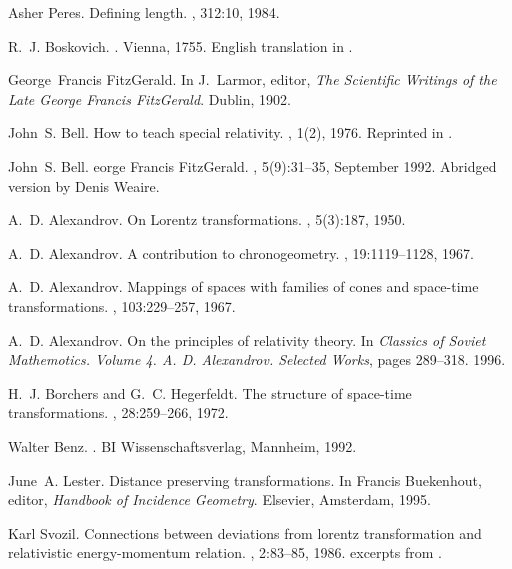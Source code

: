 \begin{thebibliography}{10}
Asher Peres.
\newblock Defining length.
, 312:10, 1984.

R.~J. Boskovich.
.
\newblock Vienna, 1755.
\newblock English translation in \cite{bos1}.

George~Francis FitzGerald.
\newblock In J.~Larmor, editor, {\em The Scientific Writings of the Late
  {G}eorge {F}rancis {F}itzGerald}. Dublin, 1902.

John~S. Bell.
\newblock How to teach special relativity.
, 1(2), 1976.
\newblock Reprinted in \cite[pp. 67-80]{bell-87}.

John~S. Bell.
eorge {F}rancis {F}itz{G}erald.
, 5(9):31--35, September 1992.
\newblock Abridged version by Denis Weaire.

A.~D. Alexandrov.
\newblock On {L}orentz transformations.
, 5(3):187, 1950.

A.~D. Alexandrov.
\newblock A contribution to chronogeometry.
, 19:1119--1128, 1967.

A.~D. Alexandrov.
\newblock Mappings of spaces with families of cones and space-time
  transformations.
, 103:229--257, 1967.

A.~D. Alexandrov.
\newblock On the principles of relativity theory.
\newblock In {\em Classics of Soviet Mathemotics. Volume 4. A. D. Alexandrov.
  Selected Works}, pages 289--318. 1996.

H.~J. Borchers and G.~C. Hegerfeldt.
\newblock The structure of space-time transformations.
, 28:259--266, 1972.

Walter Benz.
.
\newblock BI Wissenschaftsverlag, Mannheim, 1992.

June~A. Lester.
\newblock Distance preserving transformations.
\newblock In Francis Buekenhout, editor, {\em Handbook of Incidence Geometry}.
  Elsevier, Amsterdam, 1995.

Karl Svozil.
\newblock Connections between deviations from lorentz transformation and
  relativistic energy-momentum relation.
, 2:83--85, 1986.
\newblock excerpts from \cite{svo-83}.


\end{thebibliography}
